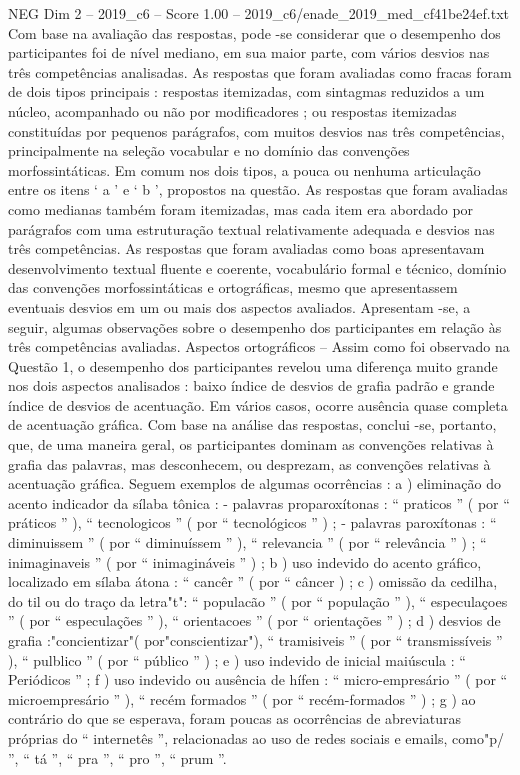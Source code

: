 \begin{textsample}{NEG Dim 2 – 2019\_c6 – Score 1.00 – 2019\_c6/enade\_2019\_med\_cf41be24ef.txt}
Com base na avaliação das respostas, pode -se considerar que o desempenho dos participantes foi de nível mediano, em sua maior parte, com vários desvios nas três competências analisadas.
As respostas que foram avaliadas como fracas foram de dois tipos principais : respostas itemizadas, com sintagmas reduzidos a um núcleo, acompanhado ou não por modificadores ; ou respostas itemizadas constituídas por pequenos parágrafos, com muitos desvios nas três competências, principalmente na seleção vocabular e no domínio das convenções morfossintáticas.
Em comum nos dois tipos, a pouca ou nenhuma articulação entre os itens ‘ a ’ e ‘ b ’, propostos na questão.
As respostas que foram avaliadas como medianas também foram itemizadas, mas cada item era abordado por parágrafos com uma estruturação textual relativamente adequada e desvios nas três competências.
As respostas que foram avaliadas como boas apresentavam desenvolvimento textual fluente e coerente, vocabulário formal e técnico, domínio das convenções morfossintáticas e ortográficas, mesmo que apresentassem eventuais desvios em um ou mais dos aspectos avaliados.
Apresentam -se, a seguir, algumas observações sobre o desempenho dos participantes em relação às três competências avaliadas.
Aspectos ortográficos – Assim como foi observado na Questão 1, o desempenho dos participantes revelou uma diferença muito grande nos dois aspectos analisados : baixo índice de desvios de grafia padrão e grande índice de desvios de acentuação.
Em vários casos, ocorre ausência quase completa de acentuação gráfica.
Com base na análise das respostas, conclui -se, portanto, que, de uma maneira geral, os participantes dominam as convenções relativas à grafia das palavras, mas desconhecem, ou desprezam, as convenções relativas à acentuação gráfica.
Seguem exemplos de algumas ocorrências : a ) eliminação do acento indicador da sílaba tônica : - palavras proparoxítonas : “ praticos ” ( por “ práticos ” ), “ tecnologicos ” ( por “ tecnológicos ” ) ; - palavras paroxítonas : “ diminuissem ” ( por “ diminuíssem ” ), “ relevancia ” ( por “ relevância ” ) ; “ inimaginaveis ” ( por “ inimagináveis ” ) ; b ) uso indevido do acento gráfico, localizado em sílaba átona : “ cancêr ” ( por “ câncer ) ; c ) omissão da cedilha, do til ou do traço da letra"t": “ populacão ” ( por “ população ” ), “ especulaçoes ” ( por “ especulações ” ), “ orientacoes ” ( por “ orientações ” ) ; d ) desvios de grafia :"concientizar"( por"conscientizar"), “ tramisiveis ” ( por “ transmissíveis ” ), “ pulblico ” ( por “ público ” ) ; e ) uso indevido de inicial maiúscula : “ Periódicos ” ; f ) uso indevido ou ausência de hífen : “ micro-empresário ” ( por “ microempresário ” ), “ recém formados ” ( por “ recém-formados ” ) ; g ) ao contrário do que se esperava, foram poucas as ocorrências de abreviaturas próprias do “ internetês ”, relacionadas ao uso de redes sociais e emails, como"p/ ”, “ tá ”, “ pra ”, “ pro ”, “ prum ”.

\end{textsample}
